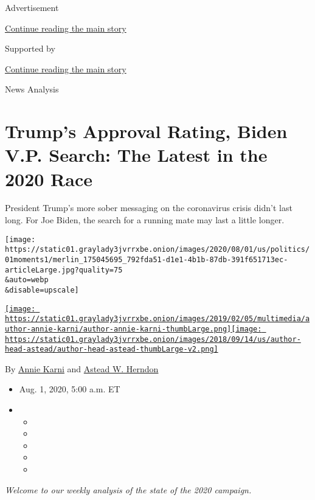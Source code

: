 Advertisement

\protect\hyperlink{after-top}{Continue reading the main story}

Supported by

\protect\hyperlink{after-sponsor}{Continue reading the main story}

News Analysis

\hypertarget{trumps-approval-rating-biden-vp-search-the-latest-in-the-2020-race}{%
\section{Trump's Approval Rating, Biden V.P. Search: The Latest in the
2020
Race}\label{trumps-approval-rating-biden-vp-search-the-latest-in-the-2020-race}}

President Trump's more sober messaging on the coronavirus crisis didn't
last long. For Joe Biden, the search for a running mate may last a
little longer.

\texttt{[image: https://static01.graylady3jvrrxbe.onion/images/2020/08/01/us/politics/01moments1/merlin\_175045695\_792fda51-d1e1-4b1b-87db-391f651713ec-articleLarge.jpg?quality=75\\\&auto=webp\\\&disable=upscale]}

\href{https://www.nytimes3xbfgragh.onion/by/annie-karni}{\texttt{[image: https://static01.graylady3jvrrxbe.onion/images/2019/02/05/multimedia/author-annie-karni/author-annie-karni-thumbLarge.png]}}\href{https://www.nytimes3xbfgragh.onion/by/astead-w-herndon}{\texttt{[image: https://static01.graylady3jvrrxbe.onion/images/2018/09/14/us/author-head-astead/author-head-astead-thumbLarge-v2.png]}}

By \href{https://www.nytimes3xbfgragh.onion/by/annie-karni}{Annie Karni}
and \href{https://www.nytimes3xbfgragh.onion/by/astead-w-herndon}{Astead
W. Herndon}

\begin{itemize}
\item
  Aug. 1, 2020, 5:00 a.m. ET
\item
  \begin{itemize}
  \item
  \item
  \item
  \item
  \item
  \end{itemize}
\end{itemize}

\emph{Welcome to our weekly analysis of the state of the 2020 campaign.}

